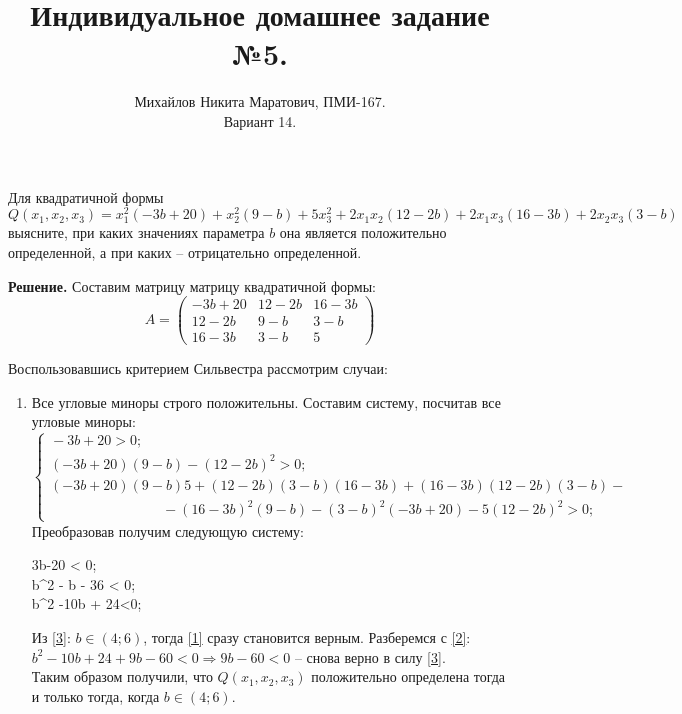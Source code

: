 \documentclass[a4paper, 12pt]{article}
\title{
     Индивидуальное домашнее задание №5.
 }
\author{Михайлов Никита Маратович, ПМИ-167.\\
        Вариант 14.
}
\date{}
\begin{document}
\maketitle
\begin{spacing}{1}


\begin{center}
\end{center}

\noindent Для квадратичной формы
$$Q(x_1, x_2, x_3) = x_1^2(-3b+20)+x_2^2(9-b) + 5x_3^2 + 2x_1x_2(12-2b)+2x_1x_3(16-3b)+2x_2x_3(3-b)$$
выясните, при каких значениях параметра $b$ она является положительно определенной, а при каких -- отрицательно определенной.

\noindent \textbf{Решение. } Составим матрицу матрицу квадратичной формы:
$$
A =
\begin{pmatrix}
	-3b+20 & 12-2b & 16-3b \\
	12-2b  & 9 - b & 3-b \\
	16-3b  & 3-b   & 5
\end{pmatrix}
$$

Воспользовавшись критерием Сильвестра рассмотрим случаи:
\begin{enumerate}
	\item Все угловые миноры строго положительны. Составим систему, посчитав все угловые миноры: 
	$$
	\begin{cases}{}
		-3b+20 > 0; \\[10pt] 
		(-3b+20)(9-b) - (12-2b)^2 > 0;\\[10pt]
		(-3b+20)(9-b)5 + (12-2b)(3-b)(16-3b) + (16-3b)(12-2b)(3-b) - \\
		\qquad \qquad \qquad \qquad -(16-3b)^2(9-b) - (3-b)^2(-3b+20) - 5(12-2b)^2 > 0;
	\end{cases}
	$$
	Преобразовав получим следующую систему:
	\begin{numcases}{}
		3b-20 < 0; \label{1}\\[10pt] 
		b^2 - b - 36 < 0; \label{2}\\[10pt]
		b^2 -10b + 24<0; \label{3} 
	\end{numcases}
	Из \eqref{3}: $b \in (4;6)$, тогда \eqref{1} сразу становится верным. Разберемся с \eqref{2}: \\$b^2 - 10b + 24 + 9b - 60 < 0 \Rightarrow 9b-60 < 0$ -- снова верно в силу \eqref{3}.\\
	Таким образом получили, что $Q(x_1,x_2,x_3)$ положительно определена тогда и только тогда, когда $b \in (4;6)$.
	

\end{enumerate}
\end{spacing}
\end{document}
